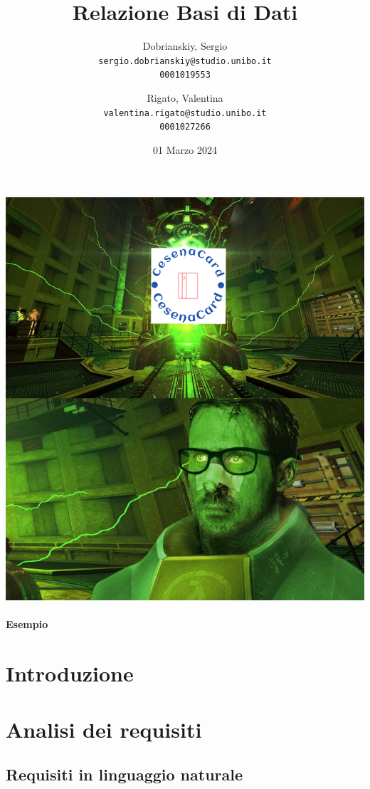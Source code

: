 \documentclass{article}
\title{Relazione Basi di Dati}
\author{
  Dobrianskiy, Sergio \\
  \texttt{sergio.dobrianskiy@studio.unibo.it}\\
  \texttt{0001019553}
  \and
  Rigato, Valentina\\
  \texttt{valentina.rigato@studio.unibo.it}\\
  \texttt{0001027266}
}
\date{01 Marzo 2024}
\begin{document}
 

\maketitle
\includegraphics[width=0.95\columnwidth]{CesenaCard2.png}
\newpage

\paragraph{Esempio}

\newpage

\tableofcontents
\clearpage

\section{Introduzione}



\section{Analisi dei requisiti}

\subsection{Requisiti in linguaggio naturale}

\end{document}
